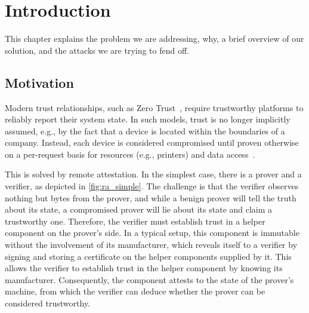 
\chapter{Introduction}\label{chapter:introduction}

This chapter explains the problem we are addressing, why, a brief overview of our solution, and the attacks we are trying to fend off.


\section{Motivation}


Modern trust relationships, such as Zero Trust~\cite{isaca2021}, require trustworthy platforms to reliably report their system state.
In such models, trust is no longer implicitly assumed, e.g., by the fact that a device is located within the boundaries of a company.
Instead, each device is considered compromised until proven otherwise on a per-request basis for resources (e.g., printers) and data access~\cite{Rose2020}.


This is solved by remote attestation.
In the simplest case, there is a prover and a verifier, as depicted in \autoref{fig:ra_simple}.
The challenge is that the verifier observes nothing but bytes from the prover, and while a benign prover will tell the truth about its state, a compromised prover will lie about its state and claim a trustworthy one.
Therefore, the verifier must establish trust in a helper component on the prover's side.
In a typical setup, this component is immutable without the involvement of its manufacturer, which reveals itself to a verifier by signing and storing a certificate on the helper components supplied by it.
This allows the verifier to establish trust in the helper component by knowing its manufacturer.
Consequently, the component attests to the state of the prover's machine, from which the verifier can deduce whether the prover can be considered trustworthy.




